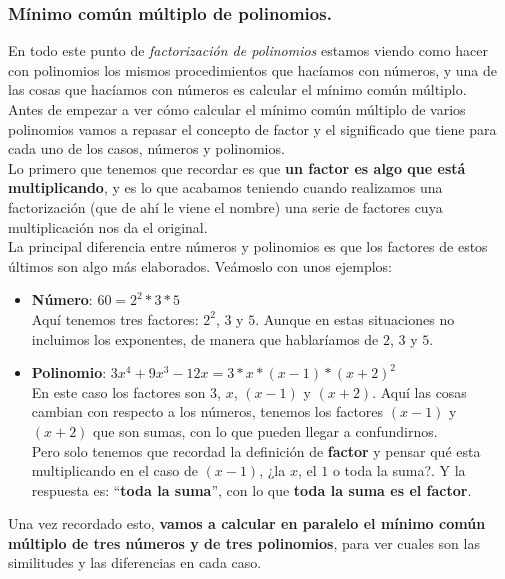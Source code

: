 \documentclass[a4paper,11pt,answers]{exam}
\begin{document}
\subsubsection{Mínimo común múltiplo de polinomios.}
En todo este punto de \emph{factorización de polinomios} estamos viendo como hacer con polinomios los mismos procedimientos que hacíamos con números, y una de las cosas que hacíamos con números es calcular el mínimo común múltiplo.\\

Antes de empezar a ver cómo calcular el mínimo común múltiplo de varios polinomios vamos a repasar el concepto de factor y el significado que tiene para cada uno de los casos, números y polinomios.\\

Lo primero que tenemos que recordar es que \textbf{un factor es algo que está multiplicando}, y es lo que acabamos teniendo cuando realizamos una factorización (que de ahí le viene el nombre) una serie de factores cuya multiplicación nos da el original.\\

La principal diferencia entre números y polinomios es que los factores de estos últimos son algo más elaborados.
Veámoslo con unos ejemplos:
\begin{itemize}
\item \textbf{Número}: $60 = 2^2 * 3* 5$\\
  Aquí tenemos tres factores: $2^2$, $3$ y $5$. Aunque en estas situaciones no incluimos los exponentes, de manera que
  hablaríamos de $2$, $3$ y $5$.
\item \textbf{Polinomio}: $3x^4 + 9x^3 - 12x = 3*x*(x-1)*(x+2)^2$\\
  En este caso los factores son $3$, $x$, $(x-1)$ y $(x+2)$. Aquí las cosas cambian con respecto a los números, tenemos los factores $(x-1)$ y $(x+2)$ que son sumas, con lo que pueden llegar a confundirnos.\\
  Pero solo tenemos que recordad la definición de \textbf{factor} y pensar qué esta multiplicando en el caso de $(x-1)$, ¿la $x$, el $1$ o toda la suma?. Y la respuesta es: ``\textbf{toda la suma}'', con lo que \textbf{toda la suma es el factor}.
\end{itemize}

Una vez recordado esto, \textbf{vamos a calcular en paralelo el mínimo común múltiplo de tres números y de tres polinomios}, para ver cuales son las similitudes y las diferencias en cada caso.\\
\end{document}
